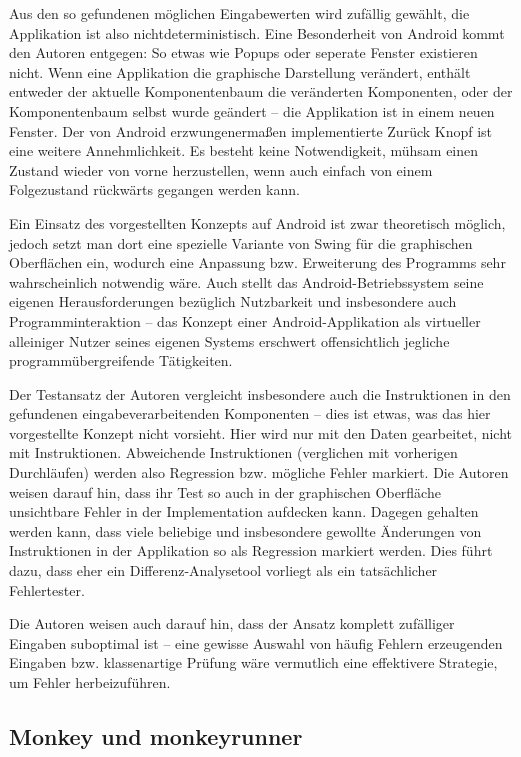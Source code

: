 Aus den so gefundenen möglichen Eingabewerten wird zufällig gewählt,
die Applikation ist also nichtdeterministisch. Eine Besonderheit von Android
kommt den Autoren entgegen: So etwas wie Popups oder seperate Fenster existieren nicht.
Wenn eine Applikation die graphische Darstellung verändert, enthält entweder
der aktuelle Komponentenbaum die veränderten Komponenten, oder der
Komponentenbaum selbst wurde geändert -- die Applikation ist in einem neuen Fenster.
Der von Android erzwungenermaßen implementierte \glqq{}Zurück\grqq{} Knopf ist
eine weitere Annehmlichkeit. Es besteht keine Notwendigkeit, mühsam einen Zustand wieder
von vorne herzustellen, wenn auch einfach von einem Folgezustand rückwärts
gegangen werden kann.

Ein Einsatz des vorgestellten Konzepts auf Android ist zwar theoretisch möglich, jedoch setzt
man dort eine spezielle Variante von Swing für die graphischen Oberflächen ein, 
wodurch eine Anpassung bzw. Erweiterung des Programms sehr wahrscheinlich notwendig wäre. 
Auch stellt das Android-Betriebssystem seine eigenen Herausforderungen
bezüglich Nutzbarkeit und insbesondere auch Programminteraktion -- das Konzept
einer Android-Applikation als virtueller alleiniger Nutzer seines eigenen Systems
erschwert offensichtlich jegliche programmübergreifende Tätigkeiten.

Der Testansatz der Autoren vergleicht insbesondere auch die Instruktionen in den gefundenen
eingabeverarbeitenden Komponenten -- dies ist etwas, was das hier vorgestellte Konzept nicht
vorsieht. Hier wird nur mit den Daten gearbeitet, nicht mit Instruktionen. Abweichende
Instruktionen (verglichen mit vorherigen Durchläufen) werden also Regression bzw. mögliche Fehler markiert.
Die Autoren weisen darauf hin, dass ihr Test so auch in der graphischen Oberfläche
unsichtbare Fehler in der Implementation aufdecken kann. Dagegen gehalten werden kann,
dass viele beliebige und insbesondere gewollte Änderungen von Instruktionen in
der Applikation so als Regression markiert werden. Dies führt dazu, dass eher ein
Differenz-Analysetool vorliegt als ein tatsächlicher Fehlertester.

Die Autoren weisen auch darauf hin, dass der Ansatz komplett zufälliger Eingaben
suboptimal ist -- eine gewisse Auswahl von häufig Fehlern erzeugenden Eingaben
bzw. klassenartige Prüfung wäre vermutlich eine effektivere Strategie, um Fehler
herbeizuführen.


\subsection{Monkey und monkeyrunner}

